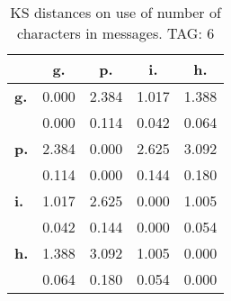 \begin{table}[h!]
\begin{center}
\begin{tabular}{| l || c | c | c | c |}\hline
 & {\bf g.} & {\bf p.} & {\bf i.} & {\bf h.} \\\hline\hline
{\bf g.} & 0.000 & 2.384 & 1.017 & 1.388 \\
{\bf } & 0.000 & 0.114 & 0.042 & 0.064 \\\hline
{\bf p.} & 2.384 & 0.000 & 2.625 & 3.092 \\
{\bf } & 0.114 & 0.000 & 0.144 & 0.180 \\\hline
{\bf i.} & 1.017 & 2.625 & 0.000 & 1.005 \\
{\bf } & 0.042 & 0.144 & 0.000 & 0.054 \\\hline
{\bf h.} & 1.388 & 3.092 & 1.005 & 0.000 \\
{\bf } & 0.064 & 0.180 & 0.054 & 0.000 \\\hline
\end{tabular}
\caption{KS distances on use of number of characters in messages. TAG: 6}
\end{center}
\end{table}